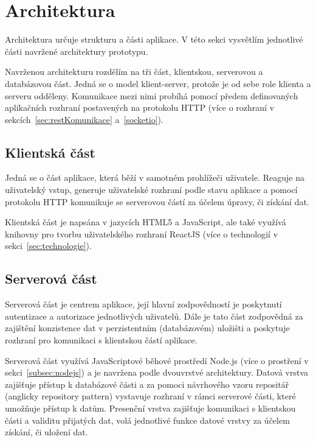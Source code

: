 
\section{Architektura}\label{sec:architektura}

Architektura určuje strukturu a části aplikace.
V této sekci vysvětlím jednotlivé části navržené architektury prototypu.

Navrženou architekturu rozdělím na tři část, klientskou, serverovou a databázovou část.
Jedná se o model klient-server, protože je od sebe role klienta a serveru odděleny.
Komunikace mezi nimi probíhá pomocí předem definovaných aplikačních rozhraní postavených na protokolu \gls{HTTP} (více o rozhraní v sekcích~\ref{sec:restKomunikace} a~\ref{socketio}).

\subsection{Klientská část}\label{subsec:klientskáČást}

Jedná se o část aplikace, která běží v samotném prohlížeči uživatele.
Reaguje na uživatelský vstup, generuje uživatelské rozhraní podle stavu aplikace a pomocí protokolu \gls{HTTP} komunikuje se serverovou částí za účelem úpravy, či získání dat.

Klientská část je napsána v jazycích HTML5 a JavaScript, ale také využívá knihovny pro tvorbu uživatelského rozhraní ReactJS (více o technologií v sekci~\ref{sec:technologie}).

\subsection{Serverová část}\label{subsec:serverováČást}

Serverová část je centrem aplikace, její hlavní zodpovědností je poskytnutí autentizace a autorizace jednotlivých uživatelů.
Dále je tato část zodpovědná za zajištění konzistence dat v perzistentním (databázovém) uložišti a poskytuje rozhraní pro komunikaci s klientskou částí aplikace.

Serverová část využívá JavaScriptové běhové prostředí Node.js (více o prostření v sekci~\ref{subsec:nodejs}) a je navržena podle dvouvrstvé architektury.
Datová vrstva zajišťuje přístup k databázové části a za pomoci návrhového vzoru repositář (anglicky repository pattern) vystavuje rozhraní v rámci serverové části, které umožňuje přístup k datům.
Presenční vrstva zajišťuje komunikaci s klientskou části a validitu přijatých dat, volá jednotlivé funkce datové vrstvy za účelem získání, či uložení dat.

